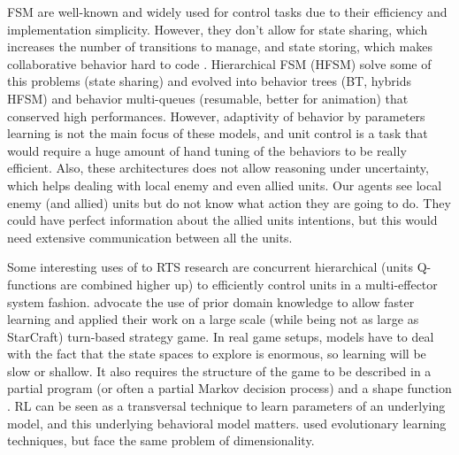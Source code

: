 FSM are well-known and widely used for control tasks due to their efficiency and implementation simplicity. However, they don't allow for state sharing, which increases the number of transitions to manage, and state storing, which makes collaborative behavior hard to code \citep{Cutumisu09}. Hierarchical FSM (HFSM) solve some of this problems (state sharing) and evolved into behavior trees (BT, hybrids HFSM) \citep{Isla} and behavior multi-queues (resumable, better for animation) \citep{Cutumisu09} that conserved high performances. %
However, adaptivity of behavior by parameters learning is not the main focus of these models, and unit control is a task that would require a huge amount of hand tuning of the behaviors to be really efficient. 
Also, these architectures does not allow reasoning under uncertainty, which helps dealing with local enemy and even allied units. Our agents see local enemy (and allied) units but do not know what action they are going to do. They could have perfect information about the allied units intentions, but this would need extensive communication between all the units.

Some interesting uses of  \citep{Sutton} to RTS research are concurrent hierarchical (units Q-functions are combined higher up)  \citep{Marthi05concurrenthierarchical} to efficiently control units in a multi-effector system fashion. \cite{Madeira06} advocate the use of prior domain knowledge to allow faster  learning and applied their work on a large scale (while being not as large as StarCraft) turn-based strategy game. In real game setups,  models have to deal with the fact that the state spaces to explore is enormous, so learning will be slow or shallow. It also requires the structure of the game to be described in a partial program (or often a partial Markov decision process) and a shape function \citep{Marthi05concurrenthierarchical}. RL can be seen as a transversal technique to learn parameters of an underlying model, and this underlying behavioral model matters. \cite{GA} used evolutionary learning techniques, but face the same problem of dimensionality. 

